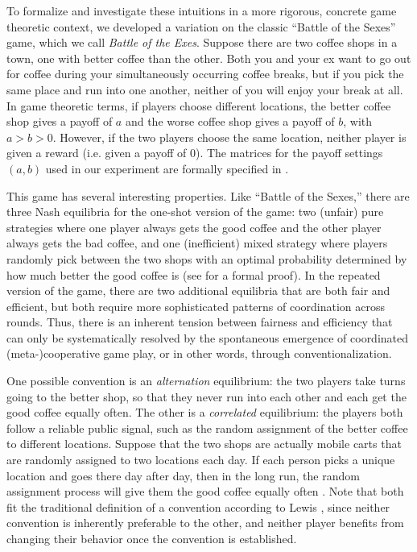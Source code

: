 \documentclass[10pt,letterpaper]{article}
\begin{document}
To formalize and investigate these intuitions in a more rigorous, concrete game theoretic context, we developed a variation on the classic ``Battle of the Sexes'' game, which we call \emph{Battle of the Exes}. Suppose there are two coffee shops in a town, one with better coffee than the other. Both you and your ex want to go out for coffee during your simultaneously occurring coffee breaks, but if you pick the same place and run into one another, neither of you will enjoy your break at all. In game theoretic terms, if players choose different locations, the better coffee shop gives a payoff of $a$ and the worse coffee shop gives a payoff of $b$, with $a > b > 0$. However, if the two players choose the same location, neither player is given a reward (i.e. given a payoff of 0). The matrices for the payoff settings $(a,b)$ used in our experiment are formally specified in .

This game has several interesting properties. Like ``Battle of the Sexes,'' there are three Nash equilibria for the one-shot version of the game: two (unfair) pure strategies where one player always gets the good coffee and the other player always gets the bad coffee, and one (inefficient) mixed strategy where players randomly pick between the two shops with an optimal probability determined by how much better the good coffee is (see  for a formal proof). In the repeated version of the game, there are two additional equilibria that are both fair and efficient, but both require more sophisticated patterns of coordination across rounds. Thus, there is an inherent tension between fairness and efficiency that can only be systematically resolved by the spontaneous emergence of coordinated (meta-)cooperative game play, or in other words, through conventionalization. 

One possible convention is an \emph{alternation} equilibrium: the two players take turns going to the better shop, so that they never run into each other and each get the good coffee equally often\cite{VanderschraafSkyrms03_LearningToTakeTurns, HelbingSchonhofStark05_EmpiricalTurnTaking, LauMui08_TurnTakingBattleOfTheSexes}. The other is a \emph{correlated} equilibrium: the players both follow a reliable public signal, such as the random assignment of the better coffee to different locations. Suppose that the two shops are actually mobile carts that are randomly assigned to two locations each day. If each person picks a unique location and goes there day after day, then in the long run, the random assignment process will give them the good coffee equally often \cite{ Aumann74_CorrelativeEquilibria, GintisHelbing15_HomoSocialis}. Note that both fit the traditional definition of a convention according to Lewis \cite{Lewis69_Convention}, since neither convention is inherently preferable to the other, and neither player benefits from changing their behavior once the convention is established.
\end{document}
